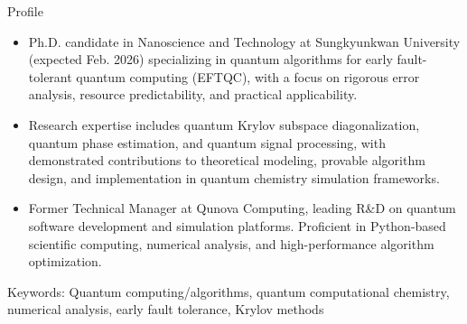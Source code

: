 \documentclass{resume} %
\begin{document}

\begin{rSection}{Profile}
{
\begin{itemize}
    \item Ph.D. candidate in Nanoscience and Technology at Sungkyunkwan University (expected Feb. 2026) specializing in quantum algorithms for early fault-tolerant quantum computing (EFTQC), with a focus on rigorous error analysis, resource predictability, and practical applicability.
    \item Research expertise includes quantum Krylov subspace diagonalization, quantum phase estimation, and quantum signal processing, with demonstrated contributions to theoretical modeling, provable algorithm design, and implementation in quantum chemistry simulation frameworks.
    \item Former Technical Manager at Qunova Computing, leading R\&D on quantum software development and simulation platforms. Proficient in Python-based scientific computing, numerical analysis, and high-performance algorithm optimization.
\end{itemize}

Keywords: Quantum computing/algorithms, quantum computational chemistry, numerical analysis, early fault tolerance, Krylov methods\\
}
\end{rSection}

\end{document}
